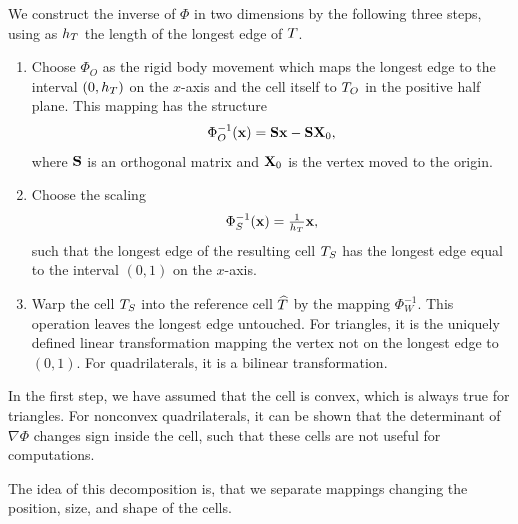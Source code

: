 \begin{example}
  We construct the inverse of $\Phi$ in two dimensions by the
  following three steps, using as $h_T$ the length of the longest
  edge of $T$.
  \begin{enumerate}
  \item Choose $\Phi_O$ as the rigid body movement which maps the
    longest edge to the interval $(0,h_T)$ on the $x$-axis and the
    cell itself to $T_O$ in the positive half plane. This mapping
    has the structure
    \begin{gather*}
      \Phi^{-1}_O (\mathbf x) = \mathbf S \mathbf x - \mathbf S \mathbf X_0,
    \end{gather*}
    where $\mathbf S$ is an orthogonal matrix and $\mathbf X_0$ is the
    vertex moved to the origin.
  \item Choose the scaling
    \begin{gather*}
      \Phi^{-1}_S (\mathbf x) = \tfrac1{h_T} \mathbf x,
    \end{gather*}
    such that the longest edge of the resulting cell $T_S$ has the
    longest edge equal to the interval $(0,1)$ on the $x$-axis.
  \item Warp the cell $T_S$ into the reference cell $\widehat{T}$ by
    the mapping $\Phi^{-1}_W$. This operation leaves the longest edge
    untouched. For triangles, it is the uniquely defined linear
    transformation mapping the vertex not on the longest edge to
    $(0,1)$. For quadrilaterals, it is a bilinear transformation.
  \end{enumerate}

  In the first step, we have assumed that the cell is convex, which is
  always true for triangles. For nonconvex quadrilaterals, it can be
  shown that the determinant of $\nabla\Phi$ changes sign inside the
  cell, such that these cells are not useful for computations.

  The idea of this decomposition is, that we separate mappings
  changing the position, size, and shape of the cells.
\end{example}

